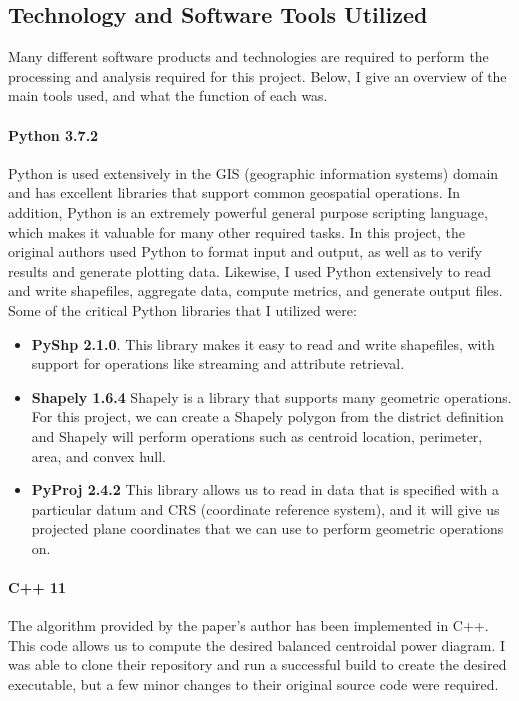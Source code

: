 \documentclass[11pt]{article}
\begin{document}
\subsection{Technology and Software Tools Utilized}

Many different software products and technologies are required to perform the processing and analysis required for this project. Below, I give an overview of the main tools used, and what the function of each was.

\paragraph{Python 3.7.2}
Python is used extensively in the GIS (geographic information systems) domain and has excellent libraries that support common geospatial operations. In addition, Python is an extremely powerful general purpose scripting language, which makes it valuable for many other required tasks. In this project, the original authors used Python to format input and output, as well as to verify results and generate plotting data. Likewise, I used Python extensively to read and write shapefiles, aggregate data, compute metrics, and generate output files. Some of the critical Python libraries that I utilized were:
\begin{itemize}
	\item \textbf{PyShp 2.1.0}. This library makes it easy to read and write shapefiles, with support for operations like streaming and attribute retrieval.
	\item \textbf{Shapely 1.6.4} Shapely is a library that supports many geometric operations. For this project, we can create a Shapely polygon from the district definition and Shapely will perform operations such as centroid location, perimeter, area, and convex hull.
	\item \textbf{PyProj 2.4.2} This library allows us to read in data that is specified with a particular datum and CRS (coordinate reference system), and it will give us projected plane coordinates that we can use to perform geometric operations on.
\end{itemize}

\paragraph{C++ 11} The algorithm provided by the paper's author has been implemented in C++. This code allows us to compute the desired balanced centroidal power diagram. I was able to clone their repository and run a successful build to create the desired executable, but a few minor changes to their original source code were required.
\end{document}
